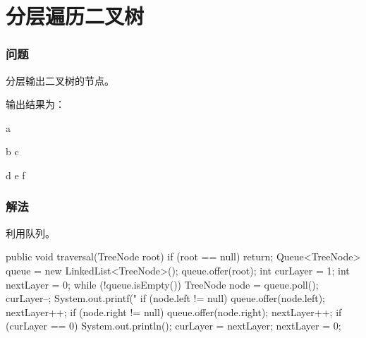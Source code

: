 \section{分层遍历二叉树} %
\label{sec:tree-level-order-traversal}


\subsubsection{问题}
分层输出二叉树的节点。
\begin{center}
	\Large
	\label{fig:tree-level-order-traversal-1}
\end{center}
输出结果为：

a

b c

d e f

\subsubsection{解法}
利用队列。

\begin{Codex}[label={[$O(N)+O(N)$]Chap03_10_TreeLevelOrderTraversal.java}]
public void traversal(TreeNode root) {
	if (root == null) {
		return;
	}
	Queue<TreeNode> queue = new LinkedList<TreeNode>();
	queue.offer(root);
	int curLayer = 1;
	int nextLayer = 0;
	while (!queue.isEmpty()) {
		TreeNode node = queue.poll();
		curLayer--;
		System.out.printf("%
		if (node.left != null) {
			queue.offer(node.left);
			nextLayer++;
		}
		if (node.right != null) {
			queue.offer(node.right);
			nextLayer++;
		}
		if (curLayer == 0) {
			System.out.println();
			curLayer = nextLayer;
			nextLayer = 0;
		}
	}
}
\end{Codex}

